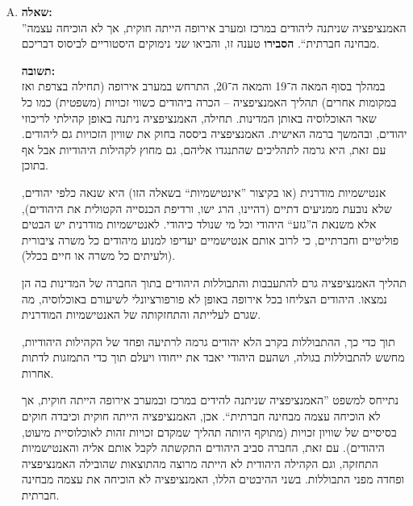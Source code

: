 \documentclass[a4paper]{article}
\newcommand\hl[1]   {#1}
\begin{document}
\begin{enumerate}[A.]
			בשלב הבא, אחרי שהתנועה הלאומית התבססה דיה, לרוב התנועה הלאומית יצאה ל\hl{פעילות פוליטית}, ולפיכך נשאו ונתנו עם השליטים המקומיים במטרה להקים מדינת לאום (בין אם באמצעות פירוק מעצמות והחלפתם במדינות לאום, ובין אם החלפת השלטון בשלטון לאומי). הפעילות הפוליטית התבטאה לעיתים בהפגנות ונסיונות הפיכה, ובעיתות אחרות באמצעות גיוס שליטים בעלי עוצמה צבאית ומדינית שתמכו ברעיון הלאומיות או שהתאים להם לתמוך ברעיון הלאומיות. 
			
			השלב הראשון, בו המשכילים ממציאים וחוקרים את ההיסטוריה של הלאום, הוא הכרחי ליצירת התודעה הלאומית, שמתפתחת ומופצת בשלב זה. 
			
			\item \textbf{שאלה: }\\
			''האמנציפציה שניתנה ליהודים במרכז ומערב אירופה הייתה חוקית, אך לא הוכיחה עצמה מבחינה חברתית``. \textbf{הסבירו} טענה זו, והביאו \textit{שני} נימוקים היסטוריים לביסוס דבריכם. 
			
			\textbf{תשובה: }\\
			במהלך בסוף המאה ה־19 והמאה ה־20, התרחש במערב אירופה (תחילה בצרפת ואז במקומות אחרים) תהליך ה\hl{אמנציפציה} – הכרה ביהודים כשווי זכויות (משפטית) כמו כל שאר האוכלוסיה באותן המדינות. תחילה, האמנציפציה ניתנה באופן קהילתי לריכוזי יהודים, ובהמשך ברמה האישית. האמנציפציה ביססה בחוק את שוויון הזכויות גם ליהודים. עם זאת, היא גרמה לתהליכים שהתנגדו אליהם, גם מחוץ לקהילות היהודיות אבל אף בתוכן. 
			
			\hl{אנטישמיות מודרנית} (או בקיצור ''אינטישמיות`` בשאלה הזו) היא שנאה כלפי יהודים, שלא נובעת ממניעים דתיים (דהיינו, הרג ישו, ורדיפת הכנסייה הקטולית את היהודים), אלא משנאת ה''גזע`` היהודי וכל מי שנולד כיהודי. לאנטישמיות מודרנית יש הבטים פוליטיים וחברתיים, כי לרוב אותם אנטישמיים יעדיפו למנוע מיהודים כל משרה ציבורית (ולעיתים כל משרה או חיים בכלל). 
			
			תהליך האמנציפציה גרם \hl{להתעבבות והתבוללות} היהודים בתוך החברה של המדינות בה הן נמצאו. היהודים הצליחו בכל אירופה באופן לא פורפורציונלי לשיעורם באוכלוסיה, מה שגרם לעלייתה והתחזקותה של האנטישמיות המודרנית. 
			
			תוך כדי כך, ההתבוללות בקרב הלא יהודים גרמה לרתיעה ופחד של הקהילות היהודיות, מחשש להתבוללות בגולה, ושהעם היהודי יאבד את ייחודו ויעלם תוך כדי התמזגות לדתות אחרות. 
			
			נתייחס למשפט ''האמנציפציה שניתנה להידים במרכז ובמערב אירופה הייתה חוקית, אך לא הוכיחה עצמה מבחינה חברתית``. אכן, האמנציפציה הייתה חוקית וכיבדה חוקים בסיסיים של שוויון זכויות (מתוקף היותה תהליך שמקדם זכויות זהות לאוכלוסיית מיעוט, היהודים). עם זאת, החברה סביב היהודים התקשתה לקבל אותם אליה והאנטישמיות התחזקה, וגם הקהילה היהודית לא הייתה מרוצה מהתוצאות שהובילה האמנציפציה ופחדה מפני התבוללות. בשני ההיבטים הללו, האמנציפציה לא הוכיחה את עצמה מבחינה חברתית. 
			
		\end{enumerate}
\end{document}
